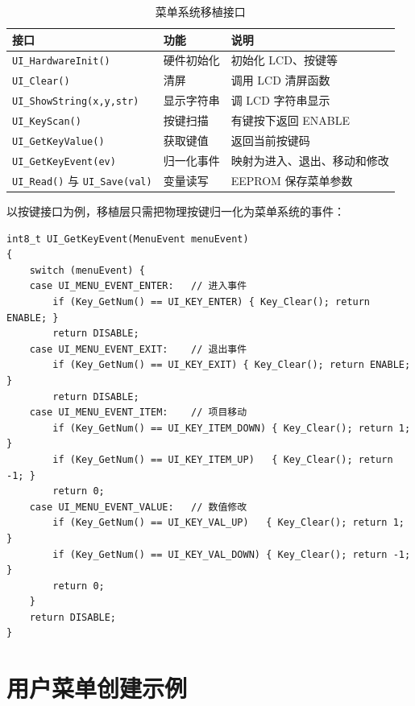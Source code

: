 \begin{table}[htbp]
\centering \caption{菜单系统移植接口} \label{tab:menu-port}
    \begin{tabular}{lll}
        \toprule
        接口 & 功能 & 说明 \\
        \midrule
        \texttt{UI\_HardwareInit()} & 硬件初始化 & 初始化 LCD、按键等 \\
        \texttt{UI\_Clear()}        & 清屏 & 调用 LCD 清屏函数 \\
        \texttt{UI\_ShowString(x,y,str)} & 显示字符串 & 调 LCD 字符串显示 \\
        \texttt{UI\_KeyScan()}      & 按键扫描 & 有键按下返回 ENABLE \\
        \texttt{UI\_GetKeyValue()}  & 获取键值 & 返回当前按键码 \\
        \texttt{UI\_GetKeyEvent(ev)}& 归一化事件 & 映射为进入、退出、移动和修改 \\
        \texttt{UI\_Read()} 与 \texttt{UI\_Save(val)} & 变量读写 & EEPROM 保存菜单参数 \\
        \bottomrule
    \end{tabular}
\end{table}

以按键接口为例，移植层只需把物理按键归一化为菜单系统的事件：

\begin{lstlisting}[style=c]
int8_t UI_GetKeyEvent(MenuEvent menuEvent)
{
    switch (menuEvent) {
    case UI_MENU_EVENT_ENTER:   // 进入事件
        if (Key_GetNum() == UI_KEY_ENTER) { Key_Clear(); return ENABLE; }
        return DISABLE;
    case UI_MENU_EVENT_EXIT:    // 退出事件
        if (Key_GetNum() == UI_KEY_EXIT) { Key_Clear(); return ENABLE; }
        return DISABLE;
    case UI_MENU_EVENT_ITEM:    // 项目移动
        if (Key_GetNum() == UI_KEY_ITEM_DOWN) { Key_Clear(); return 1; }
        if (Key_GetNum() == UI_KEY_ITEM_UP)   { Key_Clear(); return -1; }
        return 0;
    case UI_MENU_EVENT_VALUE:   // 数值修改
        if (Key_GetNum() == UI_KEY_VAL_UP)   { Key_Clear(); return 1; }
        if (Key_GetNum() == UI_KEY_VAL_DOWN) { Key_Clear(); return -1; }
        return 0;
    }
    return DISABLE;
}
\end{lstlisting}

\section{用户菜单创建示例}

